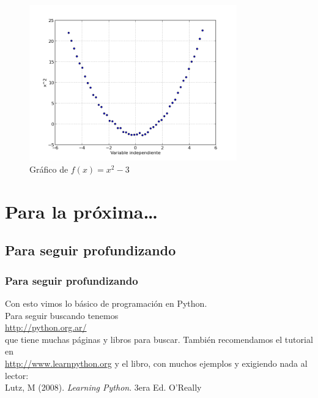 \documentclass{beamer}
\begin{document}
\begin{frame}[fragile]

\begin{figure}
\centering
\includegraphics[width=0.8\textwidth]{fig/Grafico.png}
\caption{Gráfico de $f(x) = x^2-3$}
\label{fig:my_label}
\end{figure}

\end{frame}


\section{Para la próxima\ldots}

\subsection{Para seguir profundizando}
\begin{frame}
    \frametitle{Para seguir profundizando}
    Con esto vimos lo básico de programación en Python.\\
    Para seguir buscando tenemos\\
    \url{http://python.org.ar/}\\
    que tiene muchas páginas y libros para buscar. También recomendamos el tutorial en\\
    \url{http://www.learnpython.org}
    y el libro, con muchos ejemplos y exigiendo nada al lector:\\
    Lutz, M (2008). \emph{Learning Python}. 3era Ed. O'Really
\end{frame}
\end{document}
